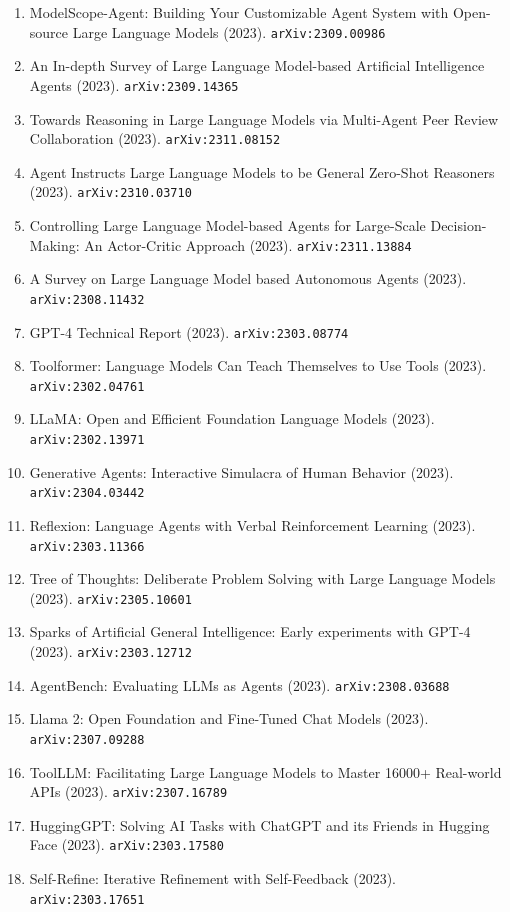 \documentclass[11pt]{article}
\begin{document}
\begin{enumerate}
  \item ModelScope-Agent: Building Your Customizable Agent System with
  Open-source Large Language Models (2023). \texttt{arXiv:2309.00986}
  \item An In-depth Survey of Large Language Model-based Artificial Intelligence
  Agents (2023). \texttt{arXiv:2309.14365}
  \item Towards Reasoning in Large Language Models via Multi-Agent Peer Review
  Collaboration (2023). \texttt{arXiv:2311.08152}
  \item Agent Instructs Large Language Models to be General Zero-Shot Reasoners (2023). \texttt{arXiv:2310.03710}
  \item Controlling Large Language Model-based Agents for Large-Scale
  Decision-Making: An Actor-Critic Approach (2023). \texttt{arXiv:2311.13884}
  \item A Survey on Large Language Model based Autonomous Agents (2023). \texttt{arXiv:2308.11432}
  \item GPT-4 Technical Report (2023). \texttt{arXiv:2303.08774}
  \item Toolformer: Language Models Can Teach Themselves to Use Tools (2023). \texttt{arXiv:2302.04761}
  \item LLaMA: Open and Efficient Foundation Language Models (2023). \texttt{arXiv:2302.13971}
  \item Generative Agents: Interactive Simulacra of Human Behavior (2023). \texttt{arXiv:2304.03442}
  \item Reflexion: Language Agents with Verbal Reinforcement Learning (2023). \texttt{arXiv:2303.11366}
  \item Tree of Thoughts: Deliberate Problem Solving with Large Language Models (2023). \texttt{arXiv:2305.10601}
  \item Sparks of Artificial General Intelligence: Early experiments with GPT-4 (2023). \texttt{arXiv:2303.12712}
  \item AgentBench: Evaluating LLMs as Agents (2023). \texttt{arXiv:2308.03688}
  \item Llama 2: Open Foundation and Fine-Tuned Chat Models (2023). \texttt{arXiv:2307.09288}
  \item ToolLLM: Facilitating Large Language Models to Master 16000+ Real-world
  APIs (2023). \texttt{arXiv:2307.16789}
  \item HuggingGPT: Solving AI Tasks with ChatGPT and its Friends in Hugging
  Face (2023). \texttt{arXiv:2303.17580}
  \item Self-Refine: Iterative Refinement with Self-Feedback (2023). \texttt{arXiv:2303.17651}

\end{enumerate}
\end{document}
